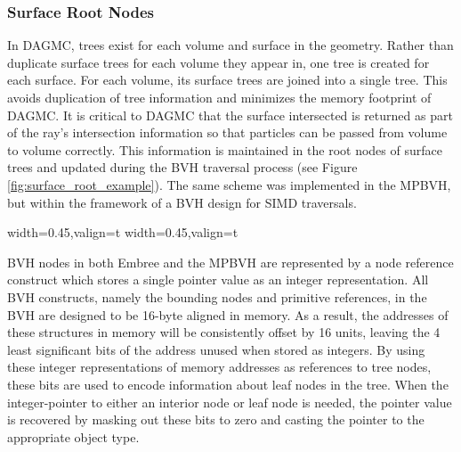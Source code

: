 \subsubsection{Surface Root Nodes}\label{sec:surface_roots}

In DAGMC, trees exist for each volume and surface in the geometry. Rather
than duplicate surface trees for each volume they appear in, one tree is created
for each surface. For each volume, its surface trees are joined
into a single tree. This avoids duplication of tree information and minimizes
the memory footprint of DAGMC. It is critical to DAGMC that the surface
intersected is returned as part of the ray's intersection information so that
particles can be passed from volume to volume correctly. This information is
maintained in the root nodes of surface trees and updated during the BVH
traversal process (see Figure \ref{fig:surface_root_example}). The same
scheme was implemented in the MPBVH, but within the framework of a BVH design
for SIMD traversals.

\begin{sidewaysfigure}
  \centering
  {width=0.45\textwidth,valign=t}
  {width=0.45\textwidth,valign=t}
  \caption[Representation of DAGMC's BVH topology.]{Left: Representation of a faceted DAGMC
    geometry. Right: The corresponding BVH structure for that volume. Surface
    sub-trees are shared between volumes to avoid duplicate data.}
  \label{fig:surface_root_example}
\end{sidewaysfigure}

BVH nodes in both Embree and the MPBVH are represented by a node reference
construct which stores a single pointer value as an integer representation. All
BVH constructs, namely the bounding nodes and primitive references, in the BVH
are designed to be 16-byte aligned in memory. As a result, the addresses of
these structures in memory will be consistently offset by 16 units, leaving the
4 least significant bits of the address unused when stored as integers. By using
these integer representations of memory addresses as references to tree nodes,
these bits are used to encode information about leaf nodes in the tree. When the
integer-pointer to either an interior node or leaf node is needed, the pointer
value is recovered by masking out these bits to zero and casting the pointer to
the appropriate object type.


